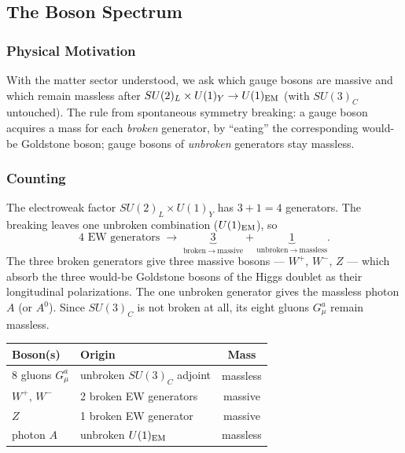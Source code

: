 \subsection{The Boson Spectrum}\label{subsec:lec20:spectrum}

\subsubsection*{Physical Motivation}

With the matter sector understood, we ask which gauge bosons are
massive and which remain massless after
$SU(2)_L\times U(1)_Y\to U(1)_{\rm EM}$ (with $SU(3)_C$ untouched).
The rule from spontaneous symmetry breaking: a gauge boson acquires a
mass for each \emph{broken} generator, by ``eating'' the corresponding
would-be Goldstone boson; gauge bosons of \emph{unbroken} generators
stay massless.

\subsubsection*{Counting}

The electroweak factor $SU(2)_L\times U(1)_Y$ has $3+1=4$ generators.
The breaking leaves one unbroken combination ($U(1)_{\rm EM}$), so
\begin{equation}
  \boxed{
    4 \text{ EW generators}
    \;\longrightarrow\;
    \underbrace{3}_{\text{broken}\ \to\ \text{massive}}
    + \underbrace{1}_{\text{unbroken}\ \to\ \text{massless}}.
  }
  \label{eq:lec20:ew-count}
\end{equation}
The three broken generators give three massive bosons --- $W^+$, $W^-$,
$Z$ --- which absorb the three would-be Goldstone bosons of the Higgs
doublet as their longitudinal polarizations. The one unbroken
generator gives the massless photon $A$ (or $A^0$). Since $SU(3)_C$ is
not broken at all, its eight gluons $G^a_\mu$ remain massless.

\begin{center}
\renewcommand{\arraystretch}{1.3}
\begin{tabular}{@{}llc@{}}
  \toprule
  Boson(s) & Origin & Mass\\
  \midrule
  $8$ gluons $G^a_\mu$ & unbroken $SU(3)_C$ adjoint & massless\\
  $W^+,\,W^-$          & 2 broken EW generators     & massive\\
  $Z$                  & 1 broken EW generator      & massive\\
  photon $A$           & unbroken $U(1)_{\rm EM}$    & massless\\
  \bottomrule
\end{tabular}
\end{center}

